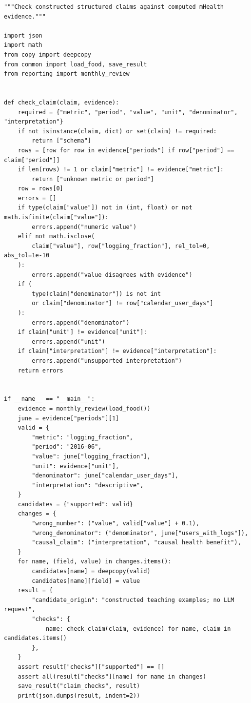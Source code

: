 \begin{Verbatim}[breaklines,breakanywhere,fontsize=\small]
"""Check constructed structured claims against computed mHealth evidence."""

import json
import math
from copy import deepcopy
from common import load_food, save_result
from reporting import monthly_review


def check_claim(claim, evidence):
    required = {"metric", "period", "value", "unit", "denominator", "interpretation"}
    if not isinstance(claim, dict) or set(claim) != required:
        return ["schema"]
    rows = [row for row in evidence["periods"] if row["period"] == claim["period"]]
    if len(rows) != 1 or claim["metric"] != evidence["metric"]:
        return ["unknown metric or period"]
    row = rows[0]
    errors = []
    if type(claim["value"]) not in (int, float) or not math.isfinite(claim["value"]):
        errors.append("numeric value")
    elif not math.isclose(
        claim["value"], row["logging_fraction"], rel_tol=0, abs_tol=1e-10
    ):
        errors.append("value disagrees with evidence")
    if (
        type(claim["denominator"]) is not int
        or claim["denominator"] != row["calendar_user_days"]
    ):
        errors.append("denominator")
    if claim["unit"] != evidence["unit"]:
        errors.append("unit")
    if claim["interpretation"] != evidence["interpretation"]:
        errors.append("unsupported interpretation")
    return errors


if __name__ == "__main__":
    evidence = monthly_review(load_food())
    june = evidence["periods"][1]
    valid = {
        "metric": "logging_fraction",
        "period": "2016-06",
        "value": june["logging_fraction"],
        "unit": evidence["unit"],
        "denominator": june["calendar_user_days"],
        "interpretation": "descriptive",
    }
    candidates = {"supported": valid}
    changes = {
        "wrong_number": ("value", valid["value"] + 0.1),
        "wrong_denominator": ("denominator", june["users_with_logs"]),
        "causal_claim": ("interpretation", "causal health benefit"),
    }
    for name, (field, value) in changes.items():
        candidates[name] = deepcopy(valid)
        candidates[name][field] = value
    result = {
        "candidate_origin": "constructed teaching examples; no LLM request",
        "checks": {
            name: check_claim(claim, evidence) for name, claim in candidates.items()
        },
    }
    assert result["checks"]["supported"] == []
    assert all(result["checks"][name] for name in changes)
    save_result("claim_checks", result)
    print(json.dumps(result, indent=2))
\end{Verbatim}


